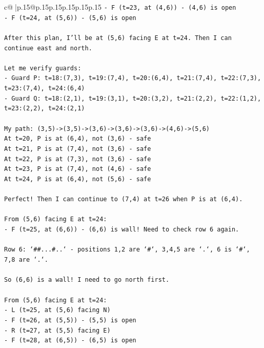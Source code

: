 \documentclass{article}
\begin{document}
{\begin{supertabular}{c@{$\;$}|p{.15\linewidth}@{}p{.15\linewidth}p{.15\linewidth}p{.15\linewidth}p{.15\linewidth}p{.15\linewidth}}
{{{\texttt{{-} F (t=23, at (4,6)) {-} (4,6) is open} \\
\texttt{{-} F (t=24, at (5,6)) {-} (5,6) is open} \\
\\ 
\texttt{After this plan, I'll be at (5,6) facing E at t=24. Then I can continue east and north.} \\
\\ 
\texttt{Let me verify guards:} \\
\texttt{{-} Guard P: t=18:(7,3), t=19:(7,4), t=20:(6,4), t=21:(7,4), t=22:(7,3), t=23:(7,4), t=24:(6,4)} \\
\texttt{{-} Guard Q: t=18:(2,1), t=19:(3,1), t=20:(3,2), t=21:(2,2), t=22:(1,2), t=23:(2,2), t=24:(2,1)} \\
\\ 
\texttt{My path: (3,5){-}>(3,5){-}>(3,6){-}>(3,6){-}>(3,6){-}>(4,6){-}>(5,6)} \\
\texttt{At t=20, P is at (6,4), not (3,6) {-} safe} \\
\texttt{At t=21, P is at (7,4), not (3,6) {-} safe} \\
\texttt{At t=22, P is at (7,3), not (3,6) {-} safe} \\
\texttt{At t=23, P is at (7,4), not (4,6) {-} safe} \\
\texttt{At t=24, P is at (6,4), not (5,6) {-} safe} \\
\\ 
\texttt{Perfect! Then I can continue to (7,4) at t=26 when P is at (6,4).} \\
\\ 
\texttt{From (5,6) facing E at t=24:} \\
\texttt{{-} F (t=25, at (6,6)) {-} (6,6) is wall! Need to check row 6 again.} \\
\\ 
\texttt{Row 6: `\#\#...\#..` {-} positions 1,2 are `\#`, 3,4,5 are `.`, 6 is `\#`, 7,8 are `.`.} \\
\\ 
\texttt{So (6,6) is a wall! I need to go north first.} \\
\\ 
\texttt{From (5,6) facing E at t=24:} \\
\texttt{{-} L (t=25, at (5,6) facing N)} \\
\texttt{{-} F (t=26, at (5,5)) {-} (5,5) is open} \\
\texttt{{-} R (t=27, at (5,5) facing E)} \\
\texttt{{-} F (t=28, at (6,5)) {-} (6,5) is open} \\
}}}
\end{supertabular}}
\end{document}
